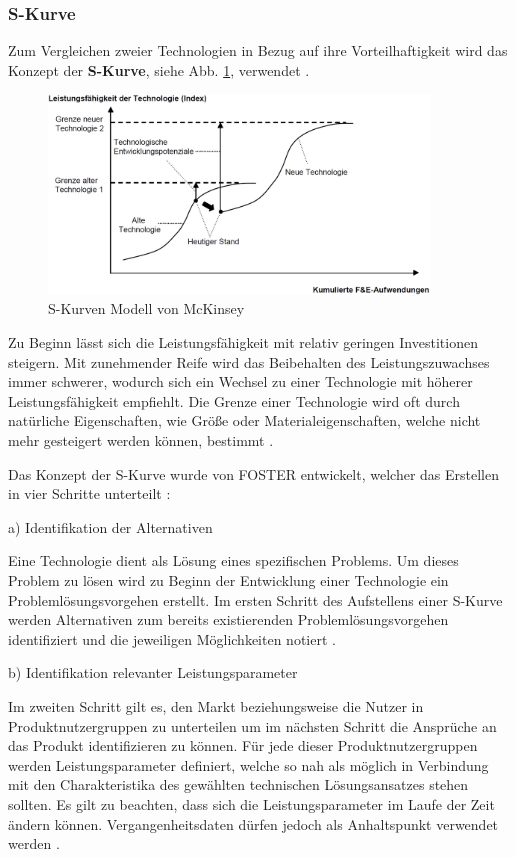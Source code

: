 \subsubsection{S-Kurve}

Zum Vergleichen zweier Technologien in Bezug auf ihre Vorteilhaftigkeit wird das Konzept der \textbf{S-Kurve}, siehe Abb. \ref{img:s-kurve}, verwendet \cite{Schumann03}.

\begin{figure}[h!]
	\centering
	\includegraphics[width=0.9\textwidth]{BilderAllgemein/s-kurve.PNG}
	\caption{S-Kurven Modell von McKinsey \cite{Gerpott05}}
	\label{img:s-kurve}
\end{figure}

Zu Beginn lässt sich die Leistungsfähigkeit mit relativ geringen Investitionen steigern. Mit zunehmender Reife wird das Beibehalten des Leistungszuwachses immer schwerer, wodurch sich ein Wechsel zu einer Technologie mit höherer Leistungsfähigkeit empfiehlt. Die Grenze einer Technologie wird oft durch natürliche Eigenschaften, wie Größe oder Materialeigenschaften, welche nicht mehr gesteigert werden können, bestimmt \cite{Bru06}.

Das Konzept der S-Kurve wurde von FOSTER entwickelt, welcher das Erstellen in vier Schritte unterteilt \cite{Foster86}:

a) Identifikation der Alternativen

Eine Technologie dient als Lösung eines spezifischen Problems. Um dieses Problem zu lösen wird zu Beginn der Entwicklung einer Technologie ein Problemlösungsvorgehen erstellt. Im ersten Schritt des Aufstellens einer S-Kurve werden Alternativen zum bereits existierenden Problemlösungsvorgehen identifiziert und die jeweiligen Möglichkeiten notiert \cite{Bru06}. 

b) Identifikation relevanter Leistungsparameter

Im zweiten Schritt gilt es, den Markt beziehungsweise die Nutzer in Produktnutzergruppen zu unterteilen um im nächsten Schritt die Ansprüche an das Produkt identifizieren zu können. Für jede dieser Produktnutzergruppen werden Leistungsparameter definiert, welche so nah als möglich in Verbindung mit den Charakteristika des gewählten technischen Lösungsansatzes stehen sollten. Es gilt zu beachten, dass sich die Leistungsparameter im Laufe der Zeit ändern können. Vergangenheitsdaten dürfen jedoch als Anhaltspunkt verwendet werden \cite{Bru06}.

